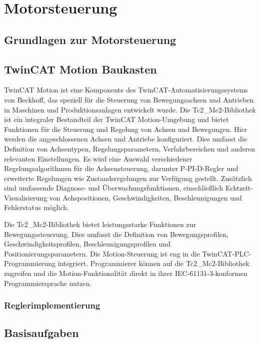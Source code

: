 \section{Motorsteuerung} \label{cpt:Motorsteuerung}


\subsection{Grundlagen zur Motorsteuerung}


\subsection{TwinCAT Motion Baukasten}

TwinCAT Motion ist eine Komponente des TwinCAT-Automatisierungssystems von Beckhoff, das speziell für die Steuerung von Bewegungsachsen und Antrieben in Maschinen und Produktionsanlagen entwickelt wurde. Die Tc2\_Mc2-Bibliothek ist ein integraler Bestandteil der TwinCAT Motion-Umgebung und bietet Funktionen für die Steuerung und Regelung von Achsen und Bewegungen. Hier werden die angeschlossenen Achsen und Antriebe konfiguriert. Dies umfasst die Definition von Achsentypen, Regelungsparametern, Verfahrbereichen und anderen relevanten Einstellungen. Es wird eine Auswahl verschiedener Regelungsalgorithmen für die Achsensteuerung, darunter P-PI-D-Regler  und erweiterte Regelungen wie Zustandsregelungen zur Verfügung gestellt. Zusätzlich sind umfassende Diagnose- und Überwachungsfunktionen, einschließlich Echtzeit-Visualisierung von Achspositionen, Geschwindigkeiten, Beschleunigungen und Fehlerstatus möglich. \cite{InfosysNCMotion}

Die Tc2\_Mc2-Bibliothek bietet leistungsstarke Funktionen zur Bewegungssteuerung. Dies umfasst die Definition von Bewegungsprofilen, Geschwindigkeitsprofilen, Beschleunigungsprofilen und Positionierungsparametern. Die Motion-Steuerung ist eng in die TwinCAT-PLC-Programmierung integriert. Programmierer können auf die Tc2\_Mc2-Bibliothek zugreifen und die Motion-Funktionalität direkt in ihrer IEC-61131-3-konformen Programmiersprache nutzen. \cite{InfosysTc2Mc2}



\subsubsection{Reglerimplementierung}

\subsection{Basisaufgaben}

